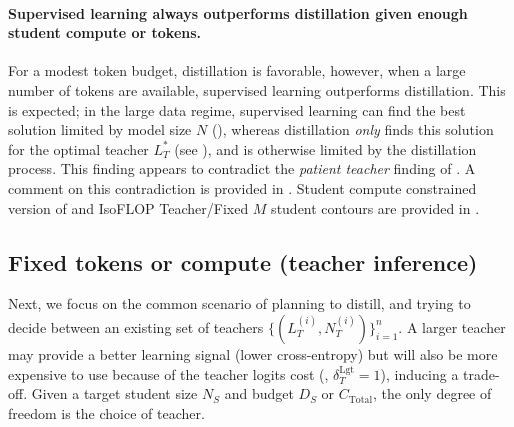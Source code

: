 \paragraph{Supervised learning always outperforms distillation given enough student compute or tokens.}
For a modest token budget, distillation is favorable,
however, when a large number of tokens are available,
supervised learning outperforms distillation.
This is expected; in the large data regime, supervised learning can find the best solution limited by model size $N$ (),
whereas distillation \emph{only} finds this solution for the optimal teacher $L_T^*$
(see ),
and is otherwise limited by the distillation process.
This finding appears to contradict the \emph{patient teacher} finding of \citet{DBLP:conf/cvpr/BeyerZRMA022}.
A comment on this contradiction is provided in .
Student compute constrained version of 
and 
IsoFLOP Teacher/Fixed $M$ student contours are provided in
.


\FloatBarrier
\subsection{Fixed tokens or compute (teacher inference)}
\label{ssec:fixed-distillation-budget-given-a-teacher}

Next, we focus on the common scenario of planning to distill, and trying to decide between 
an existing set of teachers $\{(L_T^{(i)},N_T^{(i)})\}_{i=1}^n$.
A larger teacher may provide a better learning signal (lower cross-entropy)
but will also be more expensive to use because of the teacher logits cost (, $\delta_T^{\mathrm{Lgt}}=1$),
inducing a trade-off.
Given a target student size $N_S$ and budget $D_S$ or $C_{\mathrm{Total}}$, the only degree of freedom is the choice of teacher.

